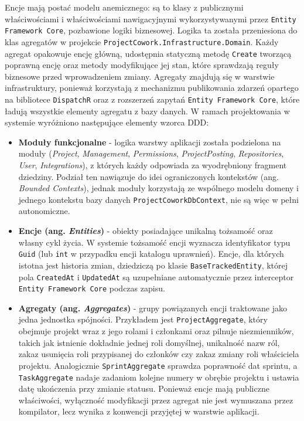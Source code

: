 Encje mają postać modelu anemicznego: są to klasy z publicznymi właściwościami i właściwościami nawigacyjnymi wykorzystywanymi przez \texttt{Entity Framework Core}, pozbawione logiki biznesowej. Logika ta została przeniesiona do klas agregatów w projekcie \texttt{ProjectCowork.Infrastructure.Domain}. Każdy agregat opakowuje encję główną, udostępnia statyczną metodę \texttt{Create} tworzącą poprawną encję oraz metody modyfikujące jej stan, które sprawdzają reguły biznesowe przed wprowadzeniem zmiany. Agregaty znajdują się w warstwie infrastruktury, ponieważ korzystają z mechanizmu publikowania zdarzeń opartego na bibliotece \texttt{DispatchR} oraz z rozszerzeń zapytań \texttt{Entity Framework Core}, które ładują wszystkie elementy agregatu z bazy danych.
W ramach projektowania w systemie wyróżniono następujące elementy wzorca DDD:
\begin{itemize}
    \item \textbf{Moduły funkcjonalne} - logika warstwy aplikacji została podzielona na moduły (\textit{Project}, \textit{Management}, \textit{Permissions}, \textit{ProjectPosting}, \textit{Repositories}, \textit{User}, \textit{Integrations}), z których każdy odpowiada za wyodrębniony fragment dziedziny. Podział ten nawiązuje do idei ograniczonych kontekstów (ang. \textit{Bounded Contexts}), jednak moduły korzystają ze wspólnego modelu domeny i jednego kontekstu bazy danych \texttt{ProjectCoworkDbContext}, nie są więc w pełni autonomiczne.
    \item \textbf{Encje (ang. \textit{Entities})} - obiekty posiadające unikalną tożsamość oraz własny cykl życia. W systemie tożsamość encji wyznacza identyfikator typu \texttt{Guid} (lub \texttt{int} w przypadku encji katalogu uprawnień). Encje, dla których istotna jest historia zmian, dziedziczą po klasie \texttt{BaseTrackedEntity}, której pola \texttt{CreatedAt} i \texttt{UpdatedAt} są uzupełniane automatycznie przez interceptor \texttt{Entity Framework Core} podczas zapisu.
    \item \textbf{Agregaty (ang. \textit{Aggregates})} - grupy powiązanych encji traktowane jako jedna jednostka spójności. Przykładem jest \texttt{ProjectAggregate}, który obejmuje projekt wraz z jego rolami i członkami oraz pilnuje niezmienników, takich jak istnienie dokładnie jednej roli domyślnej, unikalność nazw ról, zakaz usunięcia roli przypisanej do członków czy zakaz zmiany roli właściciela projektu. Analogicznie \texttt{SprintAggregate} sprawdza poprawność dat sprintu, a \texttt{TaskAggregate} nadaje zadaniom kolejne numery w obrębie projektu i ustawia datę ukończenia przy zmianie statusu. Ponieważ encje mają publiczne właściwości, wyłączność modyfikacji przez agregat nie jest wymuszana przez kompilator, lecz wynika z konwencji przyjętej w warstwie aplikacji.

\end{itemize}
